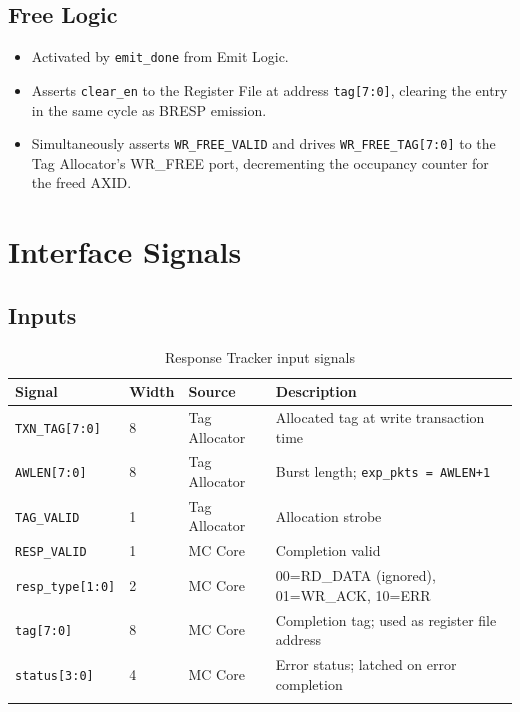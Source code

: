 \documentclass[11pt,a4paper]{article}
\begin{document}
\subsection{Free Logic}

\begin{itemize}
  \item Activated by \texttt{emit\_done} from Emit Logic.
  \item Asserts \texttt{clear\_en} to the Register File at address
        \texttt{tag[7:0]}, clearing the entry in the same cycle as
        BRESP emission.
  \item Simultaneously asserts \texttt{WR\_FREE\_VALID} and drives
        \texttt{WR\_FREE\_TAG[7:0]} to the Tag Allocator's WR\_FREE
        port, decrementing the occupancy counter for the freed AXID.
\end{itemize}

\section{Interface Signals}

\subsection{Inputs}

\begin{longtable}{p{3cm}p{1cm}p{3cm}p{7cm}}
\toprule
\textbf{Signal} & \textbf{Width} & \textbf{Source} & \textbf{Description} \\
\midrule
\texttt{TXN\_TAG[7:0]}     & 8 & Tag Allocator & Allocated tag at write transaction time \\
\texttt{AWLEN[7:0]}        & 8 & Tag Allocator & Burst length; \texttt{exp\_pkts = AWLEN+1} \\
\texttt{TAG\_VALID}        & 1 & Tag Allocator & Allocation strobe \\
\texttt{RESP\_VALID}       & 1 & MC Core       & Completion valid \\
\texttt{resp\_type[1:0]}   & 2 & MC Core       & 00=RD\_DATA (ignored), 01=WR\_ACK, 10=ERR \\
\texttt{tag[7:0]}          & 8 & MC Core       & Completion tag; used as register file address \\
\texttt{status[3:0]}       & 4 & MC Core       & Error status; latched on error completion \\
\bottomrule
\caption{Response Tracker input signals}
\end{longtable}
\end{document}
